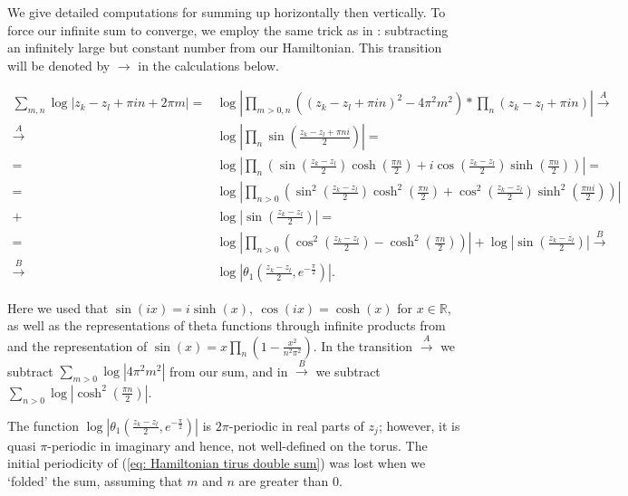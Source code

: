 \documentclass[11pt,twoside]{article}
\theoremstyle{definition}
\numberwithin{equation}{section}
\begin{document}
We give detailed computations for summing up horizontally then vertically. To force our infinite sum to converge, we employ the same trick as in \cite{montaldi2003vortex}: subtracting an infinitely large but constant number from our Hamiltonian. This transition will be denoted by $\rightarrow$ in the calculations below. 
\begin{small}
\label{eq: long calculation}
\begin{equation*}
    \begin{split}
      \sum_{m,n}\log\left|z_k-z_l +\pi i n + 2\pi m \right|  =& \log\left|\prod_{ m>0,n}\left((z_k-z_l +\pi i n)^2 - 4\pi^2 m^2\right) \ast\prod_n\left(z_k-z_l +\pi i n\right)\right|\xrightarrow[]{A} \\
      \xrightarrow[]{A}&\log\left|\prod_n\sin\left(\frac{z_k-z_l + \pi n i}{2}\right)\right|= \\=&
      \log\left|\prod_n\left(\sin\left(\frac{z_k-z_l }{2}\right)\cosh\left(\frac{\pi n }{2}\right) +i\cos\left(\frac{z_k-z_l }{2}\right)\sinh\left(\frac{\pi n }{2}\right)\right)\right| = \\=&
    \log\left|\prod_{n>0}\left(\sin^2\left(\frac{z_k-z_l }{2}\right)\cosh^2\left(\frac{\pi n }{2}\right) +\cos^2\left(\frac{z_k-z_l }{2}\right)\sinh^2\left(\frac{\pi n i}{2}\right)\right)\right|  \\ +& \log\left|\sin\left(\frac{z_k-z_l}{2}\right)\right| =\\ =&\log\left|\prod_{n>0}\left(\cos^2\left(\frac{z_k-z_l}{2}\right) - \cosh^2\left(\frac{\pi n}{2}\right)\right)\right| +\log\left|\sin\left(\frac{z_k-z_l}{2}\right)\right|\xrightarrow[]{B}\\\xrightarrow[]{B}&\log\left|\theta_1\left(\frac{z_k-z_l}{2},e^{-\frac{\pi}{2}}\right)\right|.
    \end{split}
\end{equation*}
\end{small}
Here we used that $\sin(ix) = i\sinh(x), \ \cos(ix)  = \cosh(x)$ for $x\in \mathbb{R}$, as well as the representations of theta functions through infinite products from  \cite{bonn} and the representation of $\sin(x) = x\prod\limits_n\left(1-\frac{x^2}{n^2\pi^2}\right)$. In the transition $\xrightarrow[]{A}$ we subtract  $\sum\limits_{m>0}\log|4\pi^2m^2|$ from our sum, and in $\xrightarrow[]{B}$ we subtract $\sum\limits_{n>0}\log\left|\cosh^2\left(\frac{\pi n }{2} \right)\right|$.

The function  $\log\left|\theta_1\left(\frac{z_k-z_l}{2},e^{-\frac{\pi}{2}}\right)\right|$ is $2\pi$-periodic in real parts of $z_j$; however, it is quasi $\pi$-periodic in imaginary and hence, not well-defined on the torus. The initial periodicity of (\ref{eq: Hamiltonian tirus double sum}) was lost when we `folded' the sum, assuming that $m$ and $n$ are greater than 0. 
\end{document}

